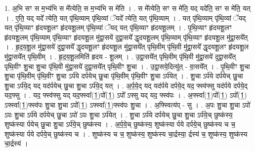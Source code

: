 \documentclass[17pt]{extarticle}
\begin{document}
1. अ॒भि सꣳ स म॒भ्य॑भि स मे᳚त्येति॒ स म॒भ्य॑भि स मे॑ति । . स मे᳚त्येति॒ सꣳ स मे॑ति॒ यद् यदे॑ति॒ सꣳ स मे॑ति॒ यत् । . ए॒ति॒ यद् यदे᳚ त्येति॒ यत् पृ॑थि॒व्याम् पृ॑थि॒व्यां ॅयदे᳚ त्येति॒ यत् पृ॑थि॒व्याम् । . यत् पृ॑थि॒व्याम् पृ॑थि॒व्यां ॅयद् यत् पृ॑थि॒व्याꣳ हृ॑दयशू॒लꣳ हृ॑दयशू॒लम् पृ॑थि॒व्यां ॅयद् यत् पृ॑थि॒व्याꣳ हृ॑दयशू॒लम् । . पृ॒थि॒व्याꣳ हृ॑दयशू॒लꣳ हृ॑दयशू॒लम् पृ॑थि॒व्याम् पृ॑थि॒व्याꣳ हृ॑दयशू॒ल मु॑द्वा॒सये॑ दुद्वा॒सये᳚ द्धृदयशू॒लम् पृ॑थि॒व्याम् पृ॑थि॒व्याꣳ हृ॑दयशू॒ल मु॑द्वा॒सये᳚त् । . हृ॒द॒य॒शू॒ल मु॑द्वा॒सये॑ दुद्वा॒सये᳚ द्धृदयशू॒लꣳ हृ॑दयशू॒ल मु॑द्वा॒सये᳚त् पृथि॒वीम् पृ॑थि॒वी मु॑द्वा॒सये᳚ द्धृदयशू॒लꣳ हृ॑दयशू॒ल मु॑द्वा॒सये᳚त् पृथि॒वीम् । . हृ॒द॒य॒शू॒लमिति॑ हृदय - शू॒लम् । . उ॒द्वा॒सये᳚त् पृथि॒वीम् पृ॑थि॒वी मु॑द्वा॒सये॑ दुद्वा॒सये᳚त् पृथि॒वीꣳ शु॒चा शु॒चा पृ॑थि॒वी मु॑द्वा॒सये॑ दुद्वा॒सये᳚त् पृथि॒वीꣳ शु॒चा । . उ॒द्वा॒सये॒दित्यु॑त् - वा॒सये᳚त् । . पृ॒थि॒वीꣳ शु॒चा शु॒चा पृ॑थि॒वीम् पृ॑थि॒वीꣳ शु॒चा ऽर्प॑ये दर्पयेच् छु॒चा पृ॑थि॒वीम् पृ॑थि॒वीꣳ शु॒चा ऽर्प॑येत् । . शु॒चा ऽर्प॑ये दर्पयेच् छु॒चा शु॒चा ऽर्प॑ये॒द् यद् यद॑र्पयेच् छु॒चा शु॒चा ऽर्प॑ये॒द् यत् । . अ॒र्प॒ये॒द् यद् यद॑र्पये दर्पये॒द् यद॒ फ्स्व॑फ्सु यद॑र्पये दर्पये॒द् यद॒फ्सु । . यद॒ फ्स्व॑फ्सु यद् यद॒फ्स्वा᳚(1॒)पो᳚(1॒) ऽपो᳚ ऽफ्सु यद् यद॒ फ्स्व॑पः । . अ॒फ्स्वा᳚(1॒)पो᳚(1॒) ऽपो᳚(1॒) ऽफ्स्वा᳚(1॒)फ्स्व॑पः शु॒चा शु॒चा ऽपो᳚(1॒) ऽफ्स्वा᳚(1॒)फ्स्व॑पः शु॒चा । . अ॒फ्स्वित्य॑प् - सु । . अ॒पः शु॒चा शु॒चा ऽपो॑ ऽपः शु॒चा ऽर्प॑ये दर्पयेच् छु॒चा ऽपो॑ ऽपः शु॒चा ऽर्प॑येत् । . शु॒चा ऽर्प॑ये दर्पयेच् छु॒चा शु॒चा ऽर्प॑ये॒च् छुष्क॑स्य॒ शुष्क॑स्या र्पयेच् छु॒चा शु॒चा ऽर्प॑ये॒च् छुष्क॑स्य । . अ॒र्प॒ये॒च् छुष्क॑स्य॒ शुष्क॑स्या र्पये दर्पये॒च् छुष्क॑स्य च च॒ शुष्क॑स्या र्पये दर्पये॒च् छुष्क॑स्य च । . शुष्क॑स्य च च॒ शुष्क॑स्य॒ शुष्क॑स्य चा॒र्द्रस्या॒ र्द्रस्य॑ च॒ शुष्क॑स्य॒ शुष्क॑स्य चा॒र्द्रस्य॑ । \newline
\end{document}
